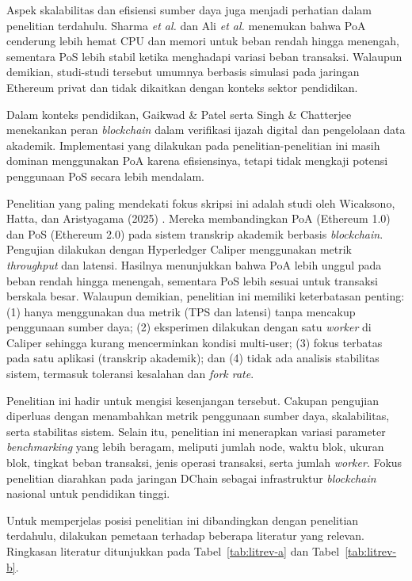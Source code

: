 Aspek skalabilitas dan efisiensi sumber daya juga menjadi perhatian dalam penelitian terdahulu. Sharma \textit{et al.} \cite{sharma2020} dan Ali \textit{et al.} \cite{ali2020} menemukan bahwa PoA cenderung lebih hemat CPU dan memori untuk beban rendah hingga menengah, sementara PoS lebih stabil ketika menghadapi variasi beban transaksi. Walaupun demikian, studi-studi tersebut umumnya berbasis simulasi pada jaringan Ethereum privat dan tidak dikaitkan dengan konteks sektor pendidikan.

Dalam konteks pendidikan, Gaikwad \& Patel \cite{gaikwad2019} serta Singh \& Chatterjee \cite{singh2019} menekankan peran \textit{blockchain} dalam verifikasi ijazah digital dan pengelolaan data akademik. Implementasi yang dilakukan pada penelitian-penelitian ini masih dominan menggunakan PoA karena efisiensinya, tetapi tidak mengkaji potensi penggunaan PoS secara lebih mendalam.

Penelitian yang paling mendekati fokus skripsi ini adalah studi oleh Wicaksono, Hatta, dan Aristyagama (2025) \cite{wicaksono2025}. Mereka membandingkan PoA (Ethereum 1.0) dan PoS (Ethereum 2.0) pada sistem transkrip akademik berbasis \textit{blockchain}. Pengujian dilakukan dengan Hyperledger Caliper menggunakan metrik \textit{throughput} dan latensi. Hasilnya menunjukkan bahwa PoA lebih unggul pada beban rendah hingga menengah, sementara PoS lebih sesuai untuk transaksi berskala besar. Walaupun demikian, penelitian ini memiliki keterbatasan penting: (1) hanya menggunakan dua metrik (TPS dan latensi) tanpa mencakup penggunaan sumber daya; (2) eksperimen dilakukan dengan satu \textit{worker} di Caliper sehingga kurang mencerminkan kondisi multi-user; (3) fokus terbatas pada satu aplikasi (transkrip akademik); dan (4) tidak ada analisis stabilitas sistem, termasuk toleransi kesalahan dan \textit{fork rate}.

Penelitian ini hadir untuk mengisi kesenjangan tersebut. Cakupan pengujian diperluas dengan menambahkan metrik penggunaan sumber daya, skalabilitas, serta stabilitas sistem. Selain itu, penelitian ini menerapkan variasi parameter \textit{benchmarking} yang lebih beragam, meliputi jumlah node, waktu blok, ukuran blok, tingkat beban transaksi, jenis operasi transaksi, serta jumlah \textit{worker}. Fokus penelitian diarahkan pada jaringan DChain sebagai infrastruktur \textit{blockchain} nasional untuk pendidikan tinggi.

Untuk memperjelas posisi penelitian ini dibandingkan dengan penelitian terdahulu, dilakukan pemetaan terhadap beberapa literatur yang relevan. Ringkasan literatur ditunjukkan pada Tabel~\ref{tab:litrev-a} dan Tabel~\ref{tab:litrev-b}.


